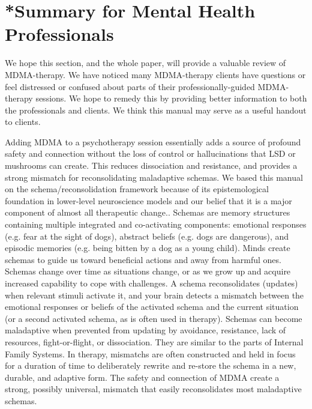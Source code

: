 \documentclass[12pt,letterpaper]{book}
\begin{document}
\section{*Summary for Mental Health Professionals}
We hope this section, and the whole paper, will provide a valuable review of MDMA-therapy. We have noticed many MDMA-therapy clients have questions or feel distressed or confused about parts of their professionally-guided MDMA-therapy sessions. We hope to remedy this by providing better information to both the professionals and clients. We think this manual may serve as a useful handout to clients.

Adding MDMA to a psychotherapy session essentially adds a source of profound safety and connection without the loss of control or hallucinations that LSD or mushrooms can create. This reduces dissociation and resistance, and provides a strong mismatch for reconsolidating maladaptive schemas. We based this manual on the schema/reconsolidation framework because of its epistemological foundation in lower-level neuroscience models and our belief that it is a major component of almost all therapeutic change.. Schemas are memory structures containing multiple integrated and co-activating components: emotional responses (e.g. fear at the sight of dogs), abstract beliefs (e.g. dogs are dangerous), and episodic memories (e.g. being bitten by a dog as a young child). Minds create schemas to guide us toward beneficial actions and away from harmful ones. Schemas change over time as situations change, or as we grow up and acquire increased capability to cope with challenges. A schema reconsolidates (updates) when relevant stimuli activate it, and your brain detects a mismatch between the emotional responses or beliefs of the activated schema and the current situation (or a second activated schema, as is often used in therapy). Schemas can become maladaptive when prevented from updating by avoidance, resistance, lack of resources, fight-or-flight, or dissociation. They are similar to the parts of Internal Family Systems. In therapy, mismatchs are often constructed and held in focus for a duration of time to deliberately rewrite and re-store the schema in a new, durable, and adaptive form. The safety and connection of MDMA create a strong, possibly universal, mismatch that easily reconsolidates most maladaptive schemas.
\end{document}
